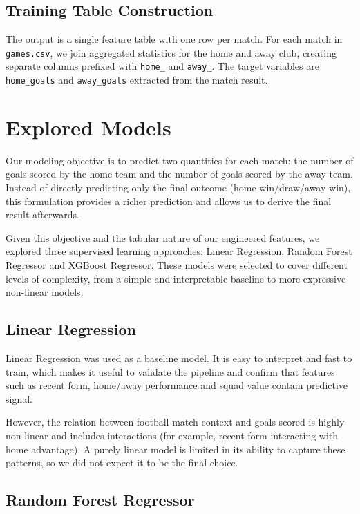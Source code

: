 \documentclass{article}
\begin{document}
\subsection{Training Table Construction}

The output is a single feature table with one row per match. For each match in \texttt{games.csv}, we join aggregated statistics for the home and away club, creating separate columns prefixed with \texttt{home\_} and \texttt{away\_}. The target variables are \texttt{home\_goals} and \texttt{away\_goals} extracted from the match result.

\section{Explored Models}

Our modeling objective is to predict two quantities for each match: the number of goals scored by the home team and the number of goals scored by the away team. Instead of directly predicting only the final outcome (home win/draw/away win), this formulation provides a richer prediction and allows us to derive the final result afterwards.

Given this objective and the tabular nature of our engineered features, we explored three supervised learning approaches: Linear Regression, Random Forest Regressor and XGBoost Regressor. These models were selected to cover different levels of complexity, from a simple and interpretable baseline to more expressive non-linear models.

\subsection{Linear Regression}

Linear Regression was used as a baseline model. It is easy to interpret and fast to train, which makes it useful to validate the pipeline and confirm that features such as recent form, home/away performance and squad value contain predictive signal.

However, the relation between football match context and goals scored is highly non-linear and includes interactions (for example, recent form interacting with home advantage). A purely linear model is limited in its ability to capture these patterns, so we did not expect it to be the final choice.

\subsection{Random Forest Regressor}
\end{document}
